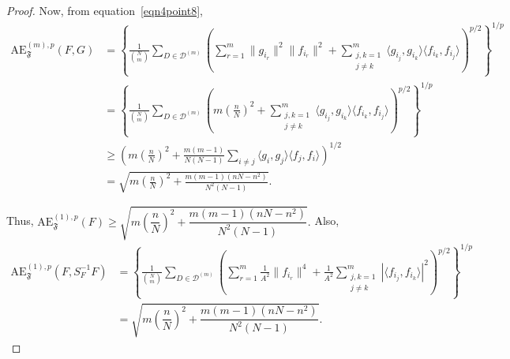 \documentclass[10pt,a4paper]{amsart}
\begin{document}
\begin{proof}
Now, from equation~\eqref{eqn4point8}, 
\begin{align*}
\mathrm{AE}_{\mathfrak{F}}^{(m),p}(F, G)
&= \left\{ \frac{1}{\binom{N}{m}} \sum_{D \in \mathcal{D}^{(m)}} \left( \sum_{r=1}^m \|g_{i_r}\|^2 \|f_{i_r}\|^2 + \sum_{\substack{j,k=1 \\ j \neq k}}^m \langle g_{i_j}, g_{i_k} \rangle \langle f_{i_k}, f_{i_j} \rangle \right)^{p/2} \right\}^{1/p} \\
&= \left\{ \frac{1}{\binom{N}{m}} \sum_{D \in \mathcal{D}^{(m)}} \left( m \left( \frac{n}{N} \right)^2 + \sum_{\substack{j,k=1 \\ j \neq k}}^m \langle g_{i_j}, g_{i_k} \rangle \langle f_{i_k}, f_{i_j} \rangle \right)^{p/2} \right\}^{1/p} \\
&\geq \left( m \left( \frac{n}{N} \right)^2 + \frac{m(m-1)}{N(N-1)} \sum_{i \neq j} \langle g_i, g_j \rangle \langle f_j, f_i \rangle \right)^{1/2} \\
&= \sqrt{ m\left( \frac{n}{N} \right)^2 + \frac{m(m-1)(nN - n^2)}{N^2(N-1)} }.
\end{align*}

Thus, $\mathrm{AE}_{\mathfrak{F}}^{(1),p}(F) \geq \sqrt{ m\left( \dfrac{n}{N} \right)^2 + \dfrac{m(m-1)(nN - n^2)}{N^2(N-1)} }.$ Also,
\begin{align*}
\mathrm{AE}_{\mathfrak{F}}^{(1),p}(F, S_{F}^{-1}F)
&= \left\{ \frac{1}{\binom{N}{m}} \sum_{D \in \mathcal{D}^{(m)}} \left( \sum_{r=1}^m \frac{1}{A^2} \|f_{i_r}\|^4 + \frac{1}{A^2} \sum_{\substack{j,k=1 \\ j \neq k}}^m |\langle f_{i_j}, f_{i_k} \rangle|^2 \right)^{p/2} \right\}^{1/p} \\
&= \sqrt{ m\left( \dfrac{n}{N} \right)^2 + \dfrac{m(m-1)(nN - n^2)}{N^2(N-1)} }.
\end{align*}


\end{proof}
\end{document}
